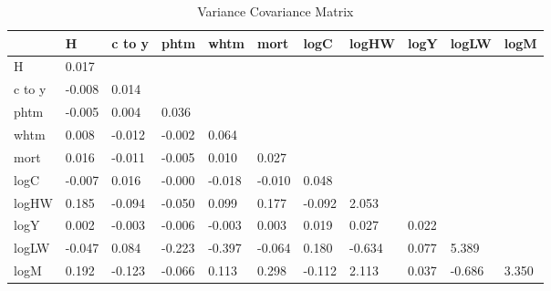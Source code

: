 \begin{table}[htbp]
\caption{\label{clabel} Variance Covariance Matrix}\centering\medskip
\begin{tabular}{lllllllllll} \hline \hline
 & H  & c to y  & phtm  & whtm  & mort  & logC  & logHW  & logY  & logLW  & logM  \\  \hline 
H &     0.017 \\  
c to y &    -0.008 &     0.014 \\  
phtm &    -0.005 &     0.004 &     0.036 \\  
whtm &     0.008 &    -0.012 &    -0.002 &     0.064 \\  
mort &     0.016 &    -0.011 &    -0.005 &     0.010 &     0.027 \\  
logC &    -0.007 &     0.016 &    -0.000 &    -0.018 &    -0.010 &     0.048 \\  
logHW &     0.185 &    -0.094 &    -0.050 &     0.099 &     0.177 &    -0.092 &     2.053 \\  
logY &     0.002 &    -0.003 &    -0.006 &    -0.003 &     0.003 &     0.019 &     0.027 &     0.022 \\  
logLW &    -0.047 &     0.084 &    -0.223 &    -0.397 &    -0.064 &     0.180 &    -0.634 &     0.077 &     5.389 \\  
logM &     0.192 &    -0.123 &    -0.066 &     0.113 &     0.298 &    -0.112 &     2.113 &     0.037 &    -0.686 &     3.350 \\  
\hline \hline \end{tabular}
\end{table}
